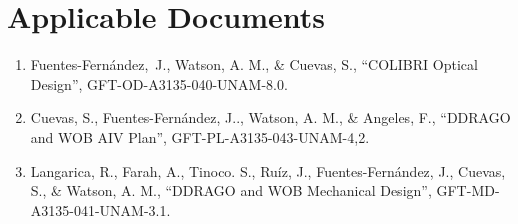 \documentclass{article}
\begin{document}
\newpage

\section*{Applicable Documents}

\begin{enumerate}[label={AD\arabic*}]
\item \label{optics} Fuentes-Fernández,~J., Watson, A. M., \& Cuevas, S., “COLIBRI Optical Design”, GFT-OD-A3135-040-UNAM-8.0.
\item \label{aiv} Cuevas, S., Fuentes-Fernández, J.., Watson, A. M., \& Angeles, F., “DDRAGO and WOB AIV Plan”, GFT-PL-A3135-043-UNAM-4,2.
\item \label{mechanics} Langarica, R., Farah, A., Tinoco. S., Ruíz, J., Fuentes-Fernández, J., Cuevas, S., \& Watson, A. M., “DDRAGO and WOB Mechanical Design”, GFT-MD-A3135-041-UNAM-3.1.
\end{enumerate}


\end{document}
